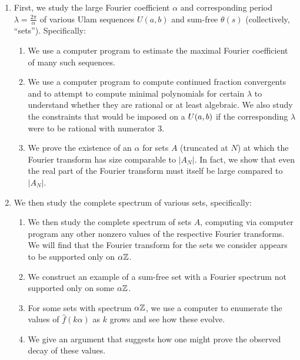 \documentclass{report}
\theoremstyle{remark}
\numberwithin{equation}{section}
\begin{document}
\begin{enumerate}
\item First, we study the large Fourier coefficient $\alpha$ and
  corresponding period $\lambda = \frac{2\pi}{\alpha}$ of various Ulam
  sequences $U(a,b)$ and sum-free $\theta(s)$ (collectively,
  ``\relevant sets'').  Specifically:
  \begin{enumerate}
  \item We use a computer program to estimate the maximal Fourier
    coefficient of many such sequences.
  \item We use a computer program to compute continued fraction
    convergents and to attempt to compute minimal polynomials for
    certain $\lambda$ to understand whether they are rational or at
    least algebraic.  We also study the constraints that would be
    imposed on a $U(a,b)$ if the corresponding $\lambda$ were to
    be rational with numerator 3.
  \item We prove the existence of an $\alpha$ for \relevant sets $A$
    (truncated at $N$) at which the Fourier transform has size
    comparable to $|A_N|$.  In fact, we show that even the real part
    of the Fourier transform must itself be large compared to $|A_N|$.
  \end{enumerate}

\item We then study the complete spectrum of various \relevant sets,
  specifically:
  \begin{enumerate}
  \item We then study the complete spectrum of \relevant sets $A$,
    computing via computer program any other nonzero values of the
    respective Fourier transforms.  We will find that the Fourier
    transform for the sets we consider appears to be supported only on
    $\alpha\mathbb{Z}$.
  \item We construct an example of a sum-free set with a Fourier
    spectrum not supported only on some $\alpha\mathbb{Z}$.
  \item For some \relevant sets with spectrum $\alpha\mathbb{Z}$, we use a
    computer to enumerate the values of $\widehat{f}(k\alpha)$ as $k$
    grows and see how these evolve.
  \item We give an argument that suggests how one might prove the
    observed decay of these values.
  \end{enumerate}


\end{enumerate}
\end{document}
